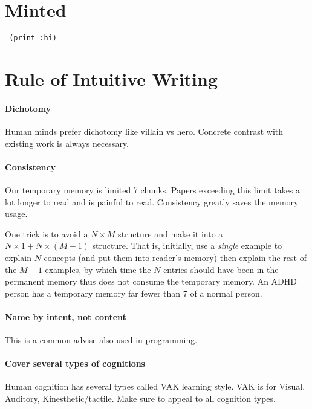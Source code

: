 \section{Minted}

\begin{verbatim}
 (print :hi)
\end{verbatim}

\section{Rule of Intuitive Writing}

\paragraph{Dichotomy}

Human minds prefer dichotomy like villain vs hero.
Concrete contrast with existing work is always necessary.

\paragraph{Consistency}

Our temporary memory is limited 7 chunks.
Papers exceeding this limit takes a lot longer to read and is painful to read.
Consistency greatly saves the memory usage.

One trick is to avoid a $N\times M$ structure and make it into a $N \times 1 + N \times (M-1)$ structure.
That is, initially, use a \emph{single} example to explain $N$ concepts (and put them into reader's memory)
then explain the rest of the $M-1$ examples, by which time the $N$ entries should have been in the permanent memory
thus does not consume the temporary memory.
An ADHD person has a temporary memory far fewer than 7 of a normal person.


\paragraph{Name by intent, not content}

This is a common advise also used in programming.

\paragraph{Cover several types of cognitions}

Human cognition has several types called VAK learning style.
VAK is for Visual, Auditory, Kinesthetic/tactile.
Make sure to appeal to all cognition types.

